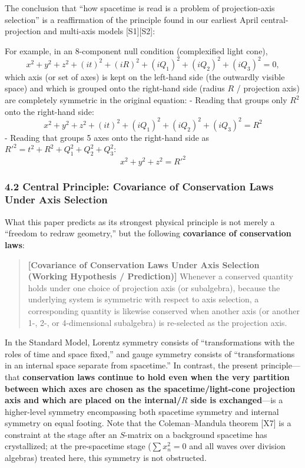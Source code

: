 \documentclass[
  a4paper,
]{article}
\begin{document}
The conclusion that ``how spacetime is read is a problem of
projection-axis selection'' is a reaffirmation of the principle found in
our earliest April central-projection and multi-axis models
{[}S1{]}{[}S2{]}:

For example, in an 8-component null condition (complexified light cone),
\[x^2 + y^2 + z^2 + (it)^2 + (iR)^2 + (iQ_1)^2 + (iQ_2)^2 + (iQ_3)^2 = 0,\]
which axis (or set of axes) is kept on the left-hand side (the outwardly
visible space) and which is grouped onto the right-hand side (radius
\(R\) / projection axis) are completely symmetric in the original
equation: - Reading that groups only \(R^2\) onto the right-hand side:
\[x^2 + y^2 + z^2 + (it)^2 + (iQ_1)^2 + (iQ_2)^2 + (iQ_3)^2 = R^2\] -
Reading that groups 5 axes onto the right-hand side as
\(R'^2 = t^2 + R^2 + Q_1^2 + Q_2^2 + Q_3^2\): \[x^2 + y^2 + z^2 = R'^2\]

\subsubsection{4.2 Central Principle: Covariance of Conservation Laws
Under Axis
Selection}\label{central-principle-covariance-of-conservation-laws-under-axis-selection}

What this paper predicts as its strongest physical principle is not
merely a ``freedom to redraw geometry,'' but the following
\textbf{covariance of conservation laws}:

\begin{quote}
\textbf{{[}Covariance of Conservation Laws Under Axis Selection (Working
Hypothesis / Prediction){]}} Whenever a conserved quantity holds under
one choice of projection axis (or subalgebra), because the underlying
system is symmetric with respect to axis selection, a corresponding
quantity is likewise conserved when another axis (or another 1-, 2-, or
4-dimensional subalgebra) is re-selected as the projection axis.
\end{quote}

In the Standard Model, Lorentz symmetry consists of ``transformations
with the roles of time and space fixed,'' and gauge symmetry consists of
``transformations in an internal space separate from spacetime.'' In
contrast, the present principle---that \textbf{conservation laws
continue to hold even when the very partition between which axes are
chosen as the spacetime/light-cone projection axis and which are placed
on the internal/\(R\) side is exchanged}---is a higher-level symmetry
encompassing both spacetime symmetry and internal symmetry on equal
footing. Note that the Coleman--Mandula theorem {[}X7{]} is a constraint
at the stage after an \(S\)-matrix on a background spacetime has
crystallized; at the pre-spacetime stage (\(\sum x_n^2 = 0\) and all
waves over division algebras) treated here, this symmetry is not
obstructed.
\end{document}
